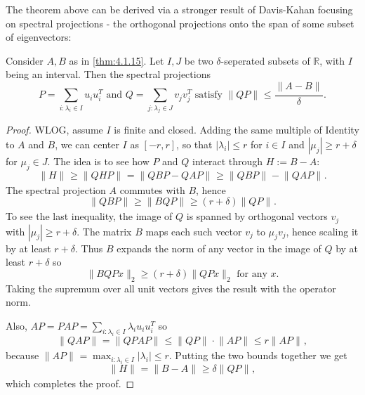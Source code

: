 The theorem above can be derived via a stronger result of Davis-Kahan focusing on spectral projections - 
the orthogonal projections onto the span of some subset of eigenvectors:

\begin{lemma}
\label{lem:4.1.16}
Consider $A, B$ as in \cref{thm:4.1.15}. Let $I, J$ be two $\delta$-seperated subsets of $\mathbb{R}$, with 
$I$ being an interval. Then the spectral projections 
\[ P = \sum_{i: \lambda_i \in I}^{} u_i u_i^T \text{ and } 
Q = \sum_{j: \lambda_j \in J}^{} v_j v_j^T \text{ satisfy } \lVert QP \rVert_{} 
\leq \frac{\lVert A - B \rVert_{}}{\delta}. \]
\end{lemma}

\begin{proof}
WLOG, assume $I$ is finite and closed. Adding the same multiple of Identity to $A$ and $B$, we can center 
$I$ as $[-r, r]$, so that $|\lambda_i| \leq r$ for $i \in I$ and $|\mu_j| \geq r + \delta$ for $\mu_j \in J$. 
The idea is to see how $P$ and $Q$ interact through $H := B - A$:
\[ \lVert H \rVert_{} \geq \lVert QHP \rVert_{} = \lVert QBP - QAP \rVert_{} 
\geq \lVert QBP \rVert_{} - \lVert QAP \rVert_{}. \]
The spectral projection $A$ commutes with $B$, hence 
\[ \lVert QBP \rVert_{} \geq \lVert BQP \rVert_{} \geq (r + \delta)\lVert QP \rVert_{}. \]
To see the last inequality, the image of $Q$ is spanned by orthogonal vectors $v_j$ with $|\mu_j| \geq 
r + \delta$. The matrix $B$ maps each such vector $v_j$ to $\mu_j v_j$, hence scaling it by at least 
$r + \delta$. Thus $B$ expands the norm of any vector in the image of $Q$ by at least $r + \delta$ so
\[  \lVert BQPx \rVert_{2} \geq (r + \delta)\lVert QPx \rVert_{2} \text{ for any } x. \]
Taking the supremum over all unit vectors gives the result with the operator norm. 

Also, $AP = PAP = \sum_{i: \lambda_i \in I}^{} \lambda_i u_i u_i^T$ so 
\[ \lVert QAP \rVert_{} = \lVert QPAP \rVert_{} \leq \lVert QP \rVert_{} \cdot \lVert AP \rVert_{} 
\leq r \lVert AP \rVert_{}, \]
because $\lVert AP \rVert_{} = \max_{i: \lambda_i \in I} |\lambda_i| \leq r$. Putting the two bounds together 
we get 
\[ \lVert H \rVert_{} = \lVert B - A \rVert_{} \geq \delta \lVert QP \rVert_{}, \]
which completes the proof.
\end{proof}

